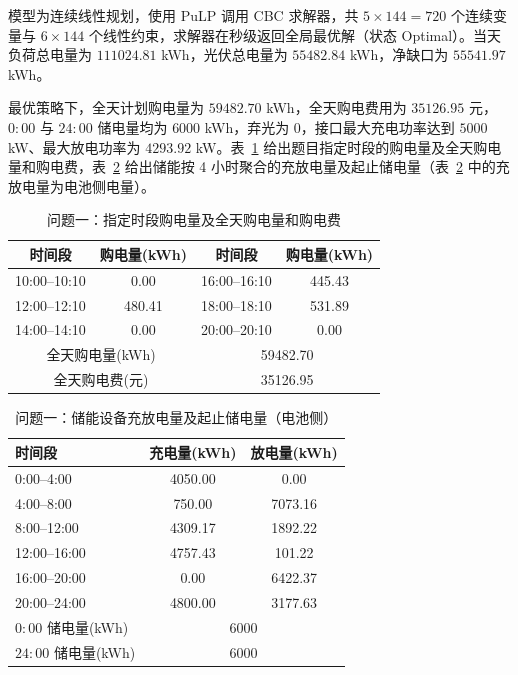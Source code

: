 模型为连续线性规划，使用 PuLP 调用 CBC 求解器，共 $5\times144=720$ 个连续变量与 $6\times144$ 个线性约束，求解器在秒级返回全局最优解（状态 Optimal）。当天负荷总电量为 $111024.81$ kWh，光伏总电量为 $55482.84$ kWh，净缺口为 $55541.97$ kWh。

最优策略下，全天计划购电量为 $59482.70$ kWh，全天购电费用为 $35126.95$ 元，$0{:}00$ 与 $24{:}00$ 储电量均为 $6000$ kWh，弃光为 $0$，接口最大充电功率达到 $5000$ kW、最大放电功率为 $4293.92$ kW。表~\ref{tab:q1_purchase} 给出题目指定时段的购电量及全天购电量和购电费，表~\ref{tab:q1_storage} 给出储能按 4 小时聚合的充放电量及起止储电量（表~\ref{tab:q1_storage} 中的充放电量为电池侧电量）。

\begin{table}[htbp]
  \centering
  \caption{问题一：指定时段购电量及全天购电量和购电费}
  \label{tab:q1_purchase}
  \begin{tabular}{cc|cc}
    \toprule
    时间段 & 购电量(kWh) & 时间段 & 购电量(kWh) \\
    \midrule
    10:00--10:10 & 0.00 & 16:00--16:10 & 445.43 \\
    12:00--12:10 & 480.41 & 18:00--18:10 & 531.89 \\
    14:00--14:10 & 0.00 & 20:00--20:10 & 0.00 \\
    \midrule
    \multicolumn{2}{c|}{全天购电量(kWh)} & \multicolumn{2}{c}{59482.70} \\
    \multicolumn{2}{c|}{全天购电费(元)} & \multicolumn{2}{c}{35126.95} \\
    \bottomrule
  \end{tabular}
\end{table}

\begin{table}[htbp]
  \centering
  \caption{问题一：储能设备充放电量及起止储电量（电池侧）}
  \label{tab:q1_storage}
  \begin{tabular}{lcc}
    \toprule
    时间段 & 充电量(kWh) & 放电量(kWh) \\
    \midrule
    0:00--4:00 & 4050.00 & 0.00 \\
    4:00--8:00 & 750.00 & 7073.16 \\
    8:00--12:00 & 4309.17 & 1892.22 \\
    12:00--16:00 & 4757.43 & 101.22 \\
    16:00--20:00 & 0.00 & 6422.37 \\
    20:00--24:00 & 4800.00 & 3177.63 \\
    \midrule
    $0{:}00$ 储电量(kWh) & \multicolumn{2}{c}{6000} \\
    $24{:}00$ 储电量(kWh) & \multicolumn{2}{c}{6000} \\
    \bottomrule
  \end{tabular}
\end{table}


